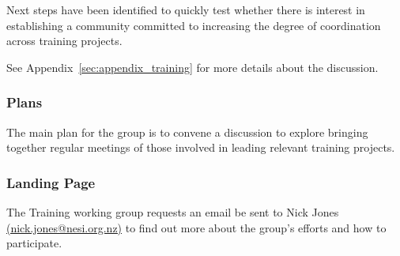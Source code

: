 Next steps have been identified to quickly test whether there is interest in
establishing a community committed to increasing the degree of coordination
across training projects.

See Appendix~\ref{sec:appendix_training} for more details about the discussion.

\subsubsection{Plans}

The main plan for the group is to convene a discussion to explore bringing
together regular meetings of those involved in leading relevant training
projects.

\subsubsection{Landing Page}

The Training working group requests an email be sent to Nick Jones
\href{mailto:nick.jones@nesi.org.nz}{(nick.jones@nesi.org.nz)} to find out more
about the group's efforts and how to participate.
